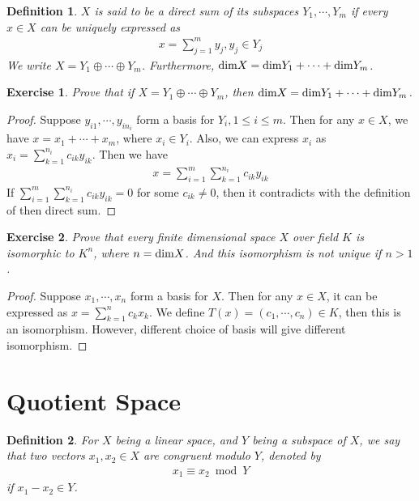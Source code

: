 \documentclass[11pt]{book}
\newtheorem{definition}{Definition}[section]
\newtheorem{exercise}{Exercise}[section]
\theoremstyle{definition}
\numberwithin{equation}{chapter}
\begin{document}
\medskip

\begin{definition}
$X$ is said to be a direct sum of its subspaces $Y_1, \cdots, Y_m$ if every $x\in X$ can be uniquely expressed as
\begin{align*}
    x = \sum^m_{j=1}y_j, y_j\in Y_j
\end{align*}
We write $X = Y_1 \oplus \cdots \oplus Y_m$. Furthermore, ${\rm dim}X = {\rm dim}Y_1 +\cdots + {\rm dim}Y_m$.
\end{definition}

\medskip

\begin{exercise}
Prove that if $X = Y_1 \oplus \cdots \oplus Y_m$, then ${\rm dim}X = {\rm dim}Y_1 +\cdots + {\rm dim}Y_m$.
\end{exercise}
\begin{proof}
Suppose $y_{i1}, \cdots, y_{in_i}$ form a basis for $Y_i, 1\leq i\leq m$. Then for any $x\in X$, we have $x = x_1 +\cdots +x_m$, where $x_i\in Y_i$. Also, we can express $x_i$ as $x_i = \sum^{n_i}_{k=1}c_{i k} y_{i k}$. Then we have 
\begin{align*}
    x = \sum^m_{i=1}\sum^{n_i}_{k=1}c_{i k} y_{i k}
\end{align*}
If $\sum^m_{i=1}\sum^{n_i}_{k=1}c_{i k} y_{i k} = 0$ for some $c_{ik}\neq 0$, then it contradicts with the definition of then direct sum.
\end{proof}

\medskip

\begin{exercise}
Prove that every finite dimensional space $X$ over field $K$ is isomorphic to $K^n$, where $n = {\rm dim}X$. And this isomorphism is not unique if $n > 1$.
\end{exercise}
\begin{proof}
Suppose $x_1,\cdots, x_n$ form a basis for $X$. Then for any $x\in X$, it can be expressed as $x = \sum^n_{k=1}c_k x_k$. We define $T(x) = (c_1, \cdots, c_n)\in K$, then this is an isomorphism. However, different choice of basis will give different isomorphism.
\end{proof}

\medskip

\section{Quotient Space}
\begin{definition}
For $X$ being a linear space, and $Y$ being a subspace of $X$, we say that two vectors $x_1, x_2\in X$ are congruent modulo $Y$, denoted by
\begin{align*}
    x_1 \equiv x_2 \bmod Y
\end{align*}
if $x_1-x_2\in Y$.
\end{definition}
\end{document}
